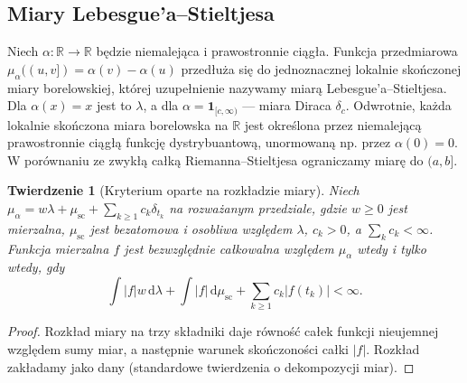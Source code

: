 \documentclass[11pt,a4paper]{article}
\numberwithin{equation}{section}
\theoremstyle{plain}
\newtheorem{twierdzenie}{Twierdzenie}[section]
\theoremstyle{definition}
\theoremstyle{remark}
\newcommand{\R}{\mathbb R}
\newcommand{\ind}[1]{\mathbf 1_{#1}}
\begin{document}
\subsection*{Miary Lebesgue'a--Stieltjesa}
Niech $\alpha:\R\to\R$ będzie niemalejąca i prawostronnie ciągła. Funkcja przedmiarowa $\mu_\alpha((u,v])=\alpha(v)-\alpha(u)$ przedłuża się do jednoznacznej lokalnie skończonej miary borelowskiej, której uzupełnienie nazywamy miarą Lebesgue'a--Stieltjesa. Dla $\alpha(x)=x$ jest to $\lambda$, a dla $\alpha=\ind{[c,\infty)}$ --- miara Diraca $\delta_c$. Odwrotnie, każda lokalnie skończona miara borelowska na $\R$ jest określona przez niemalejącą prawostronnie ciągłą funkcję dystrybuantową, unormowaną np. przez $\alpha(0)=0$. W porównaniu ze zwykłą całką Riemanna--Stieltjesa ograniczamy miarę do $(a,b]$.
\begin{twierdzenie}[Kryterium oparte na rozkładzie miary]
Niech $\mu_\alpha=w\lambda+\mu_{\mathrm{sc}}+\sum_{k\ge1}c_k\delta_{t_k}$ na rozważanym przedziale, gdzie $w\ge0$ jest mierzalna, $\mu_{\mathrm{sc}}$ jest bezatomowa i osobliwa względem $\lambda$, $c_k>0$, a $\sum_kc_k<\infty$. Funkcja mierzalna $f$ jest bezwzględnie całkowalna względem $\mu_\alpha$ wtedy i tylko wtedy, gdy
\[
\int|f|w\,\mathrm d\lambda+\int|f|\,\mathrm d\mu_{\mathrm{sc}}+\sum_{k\ge1}c_k|f(t_k)|<\infty.
\]
\end{twierdzenie}
\begin{proof}
Rozkład miary na trzy składniki daje równość całek funkcji nieujemnej względem sumy miar, a następnie warunek skończoności całki $|f|$. Rozkład zakładamy jako dany (standardowe twierdzenia o dekompozycji miar).
\end{proof}
\end{document}
